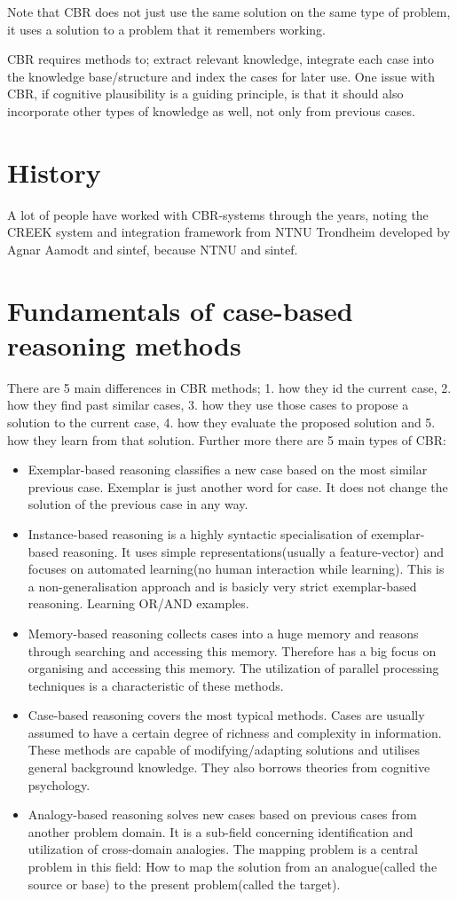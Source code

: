 \documentclass[11pt, letterpaper]{report}
\numberwithin{equation}{section}
\begin{document}
Note that CBR does not just use the same solution on the same type of problem,
it uses a solution to a problem that it remembers working.

CBR requires methods to; extract relevant knowledge, integrate each case into
the knowledge base/structure and index the cases for later use. One issue with
CBR, if cognitive plausibility is a guiding principle, is that it should also
incorporate other types of knowledge as well, not only from previous cases.

\section{History}
A lot of people have worked with CBR-systems through the years, noting the CREEK
system and integration framework from NTNU Trondheim developed by Agnar Aamodt
and sintef, because NTNU and sintef.

\section{Fundamentals of case-based reasoning methods}
There are 5 main differences in CBR methods; 1. how they id the current case, 2. how
they find past similar cases, 3. how they use those cases to propose a solution to
the current case, 4. how they evaluate the proposed solution and 5. how they
learn from that solution. Further more there are 5 main types of CBR:
\begin{itemize}
\item Exemplar-based reasoning classifies a new case based on the most similar
  previous case. Exemplar is just another word for case. It does not change the
  solution of the previous case in any way.
\item Instance-based reasoning is a highly syntactic specialisation of
  exemplar-based reasoning. It uses simple representations(usually a
  feature-vector) and focuses on automated learning(no human interaction while
  learning). This is a non-generalisation approach and is basicly
  very strict exemplar-based reasoning. Learning OR/AND examples.
\item Memory-based reasoning collects cases into a huge memory and reasons
  through searching and accessing this memory. Therefore has a big focus on
  organising and accessing this memory. The utilization of parallel processing
  techniques is a characteristic of these methods.
\item Case-based reasoning covers the most typical methods. Cases are usually
  assumed to have a certain degree of richness and complexity in information.
  These methods are capable of modifying/adapting solutions and utilises general
  background knowledge. They also borrows theories from cognitive psychology.
\item Analogy-based reasoning solves new cases based on previous cases from
  another problem domain. It is a sub-field concerning identification and
  utilization of cross-domain analogies. The mapping problem is a central
  problem in this field: How to map the solution from an analogue(called the
  source or base) to the present problem(called the target).
\end{itemize}
\end{document}
